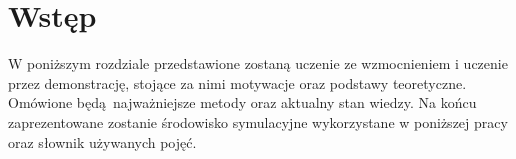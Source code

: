 \section{Wstęp}
W poniższym rozdziale przedstawione zostaną uczenie ze wzmocnieniem i uczenie przez demonstrację,  stojące za nimi motywacje oraz podstawy teoretyczne. Omówione będą najważniejsze metody oraz aktualny stan wiedzy. Na końcu zaprezentowane zostanie środowisko symulacyjne wykorzystane w poniższej pracy oraz słownik używanych pojęć.
